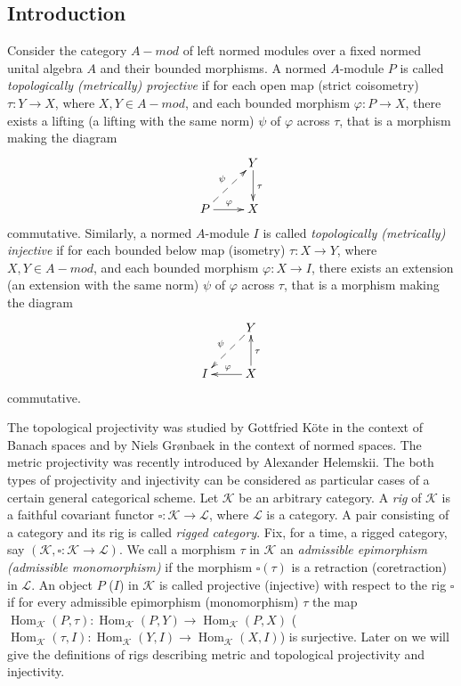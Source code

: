 \documentclass[a0b,landscape]{a0poster}
\begin{document}
\begin{multicols}{4} 

\small

\section*{Introduction}


Consider the category $A-mod$ of left normed modules over a fixed normed unital
algebra $A$ and their bounded morphisms. A normed $A$-module $P$ is called
\textit{topologically (metrically) projective} if for each open map (strict
coisometry) $\tau : Y \to X$, where $X, Y \in A-mod$, and each bounded morphism
$\varphi : P \to X$, there exists a lifting (a lifting with the same norm)
$\psi$ of $\varphi$ across $\tau$, that is a morphism making the diagram
$$
\xymatrix{
& {Y} \ar[d]^{\tau}\\  %
{P} \ar@{-->}[ur]^{\psi} \ar[r]^{\varphi} &{X}}  %
$$
commutative. Similarly, a normed $A$-module $I$ is called \textit{topologically
(metrically) injective} if for each bounded below map (isometry) $\tau : X \to
Y$, where $X, Y \in A-mod$, and each bounded morphism $\varphi : X \to I$, there
exists an extension (an extension with the same norm) $\psi$ of $\varphi$ across
$\tau$, that is a morphism making the diagram
$$
\xymatrix{
& {Y} \ar@{-->}[dl]_{\psi}\\  %
{I}  &{X} \ar[l]_{\varphi} \ar[u]_{\tau}  %
}
$$
commutative.

The topological projectivity was studied by Gottfried K\"{o}te in the context of
Banach spaces and by Niels Gr{\o}nbaek in the context of normed spaces. The
metric projectivity was recently introduced by Alexander Helemskii. The both
types of projectivity and injectivity can be considered as particular cases of a
certain general categorical scheme. Let $\mathcal{K}$ be an arbitrary category.
A \textit{rig} of $\mathcal{K}$ is a faithful covariant functor $\square :
\mathcal{K} \to \mathcal{L}$, where $\mathcal{L}$ is a category. A pair
consisting of a category and its rig is called \textit{rigged category}. Fix,
for a time, a rigged category, say $\left (\mathcal{K}, \square : \mathcal{K}
\to \mathcal{L}\right )$. We call a morphism $\tau$ in $\mathcal{K}$ an
\textit{admissible epimorphism (admissible monomorphism)} if the morphism
$\square(\tau)$ is a retraction (coretraction) in $\mathcal{L}$. An object $P$
($I$) in $\mathcal{K}$ is called projective (injective) with respect to the rig
$\square$ if for every admissible epimorphism (monomorphism) $\tau$ the map
$\operatorname{Hom}_{\mathcal{K}}(P,\tau)
:\operatorname{Hom}_{\mathcal{K}}(P,Y)\to\operatorname{Hom}_{\mathcal{K}}(P,X)$
($\operatorname{Hom}_{\mathcal{K}}(\tau,I)
:\operatorname{Hom}_{\mathcal{K}}(Y,I)\to\operatorname{Hom}_{\mathcal{K}}(X,I)$)
is surjective. Later on we will give the definitions of rigs describing metric
and topological projectivity and injectivity.


\end{multicols}
\end{document}
